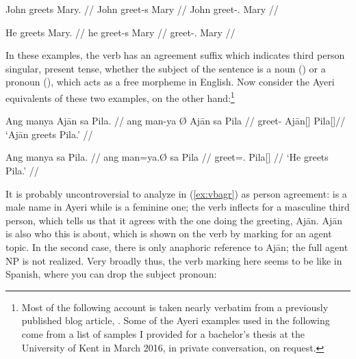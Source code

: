 \pex
\a\label{ex:vbagrengnn}\begingl
	\gla John greets Mary. //
	\glb John greet-s Mary //
	\glc John greet-\Tsg{}.\Prs{} Mary //
\endgl

\a\label{ex:vbagrengpr}\begingl
	\gla He greets Mary. //
	\glb he greet-s Mary //
	\glc \TsgM{} greet-\Tsg{}.\Prs{} Mary //
\endgl

\xe

In these examples, the verb has an agreement suffix  which indicates
third person singular, present tense, whether the subject of the sentence is a
noun () or a pronoun (), which acts as a free morpheme in
English. Now consider the Ayeri equivalents of these two examples, on the other
hand:\footnote{Most of the following account is taken nearly verbatim from a
previously published blog article, \citet{benung:verbagreement}. Some of the
Ayeri examples used in the following come from a list of samples I provided for
a bachelor's thesis at the University of Kent in March 2016, in private
conversation, on request.%
}

\pex %
\a\label{ex:vbagr}\begingl
	\gla Ang manya {} Ajān sa Pila. //
	\glb ang man-ya Ø Ajān sa Pila //
	\glc \AgtT{} greet-\TsgM{} \Top{} ​Ajān[\TsgM{}] \Parg{} Pila[\TsgF{}]//
	\glft `Ajān greets Pila.' //
\endgl

\a\label{ex:vbclt}\begingl
	\gla Ang manya sa Pila. //
	\glb ang man=ya.Ø sa ​Pila //
	\glc \AgtT{} greet=\TsgM{}.\Top{} \Parg{} ​Pila[\TsgF{}] //
	\glft `He greets Pila.' //
\endgl

\xe

It is probably uncontroversial to analyze  in (\ref{ex:vbagr}) as
person agreement:  is a male name in Ayeri while
 is a feminine one; the verb inflects for a masculine third
person, which tells us that it agrees with the one doing the greeting, Ajān.
Ajān is also who this is about, which is shown on the verb by marking for an
agent topic. In the second case, there is only anaphoric reference to Ajān; the
full agent NP is not realized. Very broadly thus, the verb marking here seems 
to be like in Spanish, where you can drop the subject pronoun:

